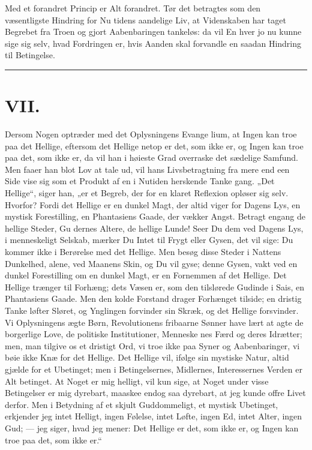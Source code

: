 \documentclass[12pt]{book}
\newcommand{\opage}[1]{\marginnote{\footnotesize\textit{[#1]}}}
\begin{document}
Med et forandret Princip er Alt forandret. Tør
det betragtes som den væsentligste Hindring for Nu\-%
tidens aandelige Liv, at Videnskaben har taget Begrebet
fra Troen og gjort Aabenbaringen tankeløs: da vil En\-%
hver jo nu kunne sige sig selv, hvad Fordringen er, hvis
Aanden skal forvandle en saadan Hindring til Betingelse.

\begin{center}\rule{3cm}{0.4pt}\end{center}

\chapter*{VII.}
\label{ch:vii}
\opage{105}\setcounter{footnote}{0}%
Dersom Nogen optræder med det Oplysningens Evange\-%
lium, at Ingen kan troe paa det Hellige, eftersom det
Hellige netop er det, som ikke er, og Ingen kan troe paa
det, som ikke er, da vil han i høieste Grad overraske
det sædelige Samfund. Men faaer han blot Lov at tale
ud, vil hans Livsbetragtning fra mere end een Side vise
sig som et Produkt af en i Nutiden herskende Tanke\-%
gang. „Det Hellige“, siger han, „er et Begreb, der for
en klaret Reflexion opløser sig selv. Hvorfor? Fordi
det Hellige er en dunkel Magt, der altid viger for Dagens
Lys, en mystisk Forestilling, en Phantasiens Gaade, der
vækker Angst. Betragt engang de hellige Steder, Gu\-%
dernes Altere, de hellige Lunde! Seer Du dem ved
Dagens Lys, i menneskeligt Selskab, mærker Du Intet
til Frygt eller Gysen, det vil sige: Du kommer ikke i
Berørelse med det Hellige. Men besøg disse Steder i
Nattens Dunkelhed, alene, ved Maanens Skin, og Du
vil gyse; denne Gysen, vakt ved en dunkel Forestilling
om en dunkel Magt, er en Fornemmen af det Hellige.
Det Hellige trænger til Forhæng; dets Væsen er, som
den tilslørede Gudinde i Sais, en Phantasiens Gaade.
Men den kolde Forstand drager Forhænget tilside; en
dristig Tanke løfter Sløret, og Ynglingen forvinder sin
\opage{106}\setcounter{footnote}{0}%
Skræk, og det Hellige forsvinder. Vi Oplysningens ægte
Børn, Revolutionens fribaarne Sønner have lært at agte
de borgerlige Love, de politiske Institutioner, Menneske\-%
nes Færd og deres Idrætter; men, man tilgive os et
dristigt Ord, vi troe ikke paa Syner og Aabenbaringer,
vi bøie ikke Knæ for det Hellige. Det Hellige vil, ifølge
sin mystiske Natur, altid gjælde for et Ubetinget; men
i Betingelsernes, Midlernes, Interessernes Verden er Alt
betinget. At Noget er mig helligt, vil kun sige, at
Noget under visse Betingelser er mig dyrebart, maaskee
endog saa dyrebart, at jeg kunde offre Livet derfor.
Men i Betydning af et skjult Guddommeligt, et mystisk
Ubetinget, erkjender jeg intet Helligt, ingen Følelse, intet
Løfte, ingen Ed, intet Alter, ingen Gud; --- jeg siger,
hvad jeg mener: Det Hellige er det, som ikke er, og
Ingen kan troe paa det, som ikke er.“
\end{document}

